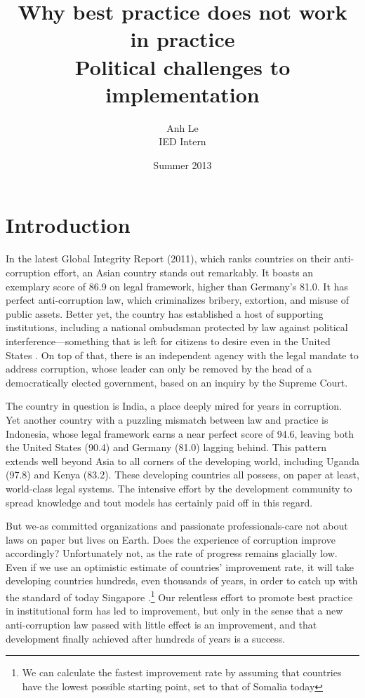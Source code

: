 \documentclass[12pt]{article}
\title{Why best practice does not work in practice \\
Political challenges to implementation}
\author{Anh Le \\
IED Intern}
\date{Summer 2013}
\begin{document}
\maketitle

\section*{Introduction}
\label{sec:intro}

In the latest Global Integrity Report (2011), which ranks countries on their anti-corruption effort, an Asian country stands out remarkably. It boasts an exemplary score of 86.9 on legal framework, higher than Germany's 81.0. It has perfect anti-corruption law, which criminalizes bribery, extortion, and misuse of public assets. Better yet, the country has established a host of supporting institutions, including a national ombudsman protected by law against political interference---something that is left for citizens to desire even in the United States \citep{MinistryofLawandJustice2003}. On top of that, there is an independent agency with the legal mandate to address corruption, whose leader can only be removed by the head of a democratically elected government, based on an inquiry by the Supreme Court.

The country in question is India, a place deeply mired for years in corruption. Yet another country with a puzzling mismatch between law and practice is Indonesia, whose legal framework earns a near perfect score of 94.6, leaving both the United States (90.4) and Germany (81.0) lagging behind. This pattern extends well beyond Asia to all corners of the developing world, including Uganda (97.8) and Kenya (83.2). These developing countries all possess, on paper at least, world-class legal systems. The intensive effort by the development community to spread knowledge and tout models has certainly paid off in this regard.

But we-as committed organizations and passionate professionals-care not about laws on paper but lives on Earth. Does the experience of corruption improve accordingly? Unfortunately not, as the rate of progress remains glacially low. Even if we use an optimistic estimate of countries' improvement rate, it will take developing countries hundreds, even thousands of years, in order to catch up with the standard of today Singapore \citep{Pritchett2010}.\footnote{We can calculate the fastest improvement rate by assuming that countries have the lowest possible starting point, set to that of Somalia today} Our relentless effort to promote best practice in institutional form has led to improvement, but only in the sense that a new anti-corruption law passed with little effect is an improvement, and that development finally achieved after hundreds of years is a success.
\end{document}
